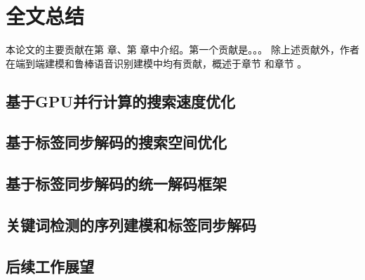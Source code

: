 
\chapter{全文总结}
\label{chap:sum}
本论文的主要贡献在第 章、第 章中介绍。第一个贡献是。。。
除上述贡献外，作者在端到端建模和鲁棒语音识别建模中均有贡献，概述于章节 和章节 。
\section{基于GPU并行计算的搜索速度优化}
\label{chap:sum-gpu}
\section{基于标签同步解码的搜索空间优化}
\label{chap:sum-lsd}
\section{基于标签同步解码的统一解码框架}
\label{chap:sum-unify}
\section{关键词检测的序列建模和标签同步解码}
\label{chap:sum-kws}
\section{后续工作展望}
\label{chap:sum-future}


